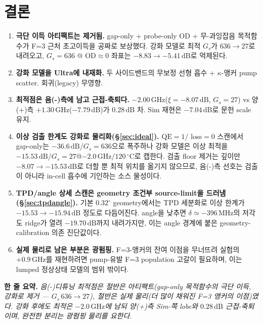\documentclass[11pt,a4paper]{article}
\newcommand{\dB}{\,\mathrm{dB}}
\newcommand{\GHz}{\,\mathrm{GHz}}
\newcommand{\MHz}{\,\mathrm{MHz}}
\newcommand{\degC}{\,^{\circ}\mathrm{C}}
\begin{document}
\section{결론}
\begin{enumerate}[nosep]
\item \textbf{극단 이득 아티팩트는 제거됨.} gap-only + probe-only OD + 무-과잉잡음
      목적함수가 F=3 근처 초고이득을 공짜로 보상했다. 강화 모델로 최적 $G_s$가
      $636\to27$로 내려오고, $G_s=636$ @ OD$\approx0$ 좌표는 $-8.83\to-5.41\dB$로
      억제된다.
\item \textbf{강화 모델을 Ultra에 내재화.} 두 사이드밴드의 무보정 선형 흡수 +
      $\kappa$-앵커 pump scatter. 회귀(legacy) 무영향.
\item \textbf{최적점은 음(-)측에 남고 근접-축퇴다.} $-2.00\GHz$($\xi=-8.07\dB$,
      $G_s=27$) vs 양(+)측 $+1.30\GHz$($-7.79\dB$)가 $0.28\dB$ 차. Sim 재현은
      $-7.04\dB$로 문헌 scale 유지.
\item \textbf{이상 검출 한계도 강화로 물리화(\S\ref{sec:ideal}).} $\mathrm{QE}=1$/
      loss$=0$ 스캔에서 gap-only는 $-36.6\dB$/$G_s=636$으로 폭주하나 강화 모델은
      이상 최적을 $-15.53\dB$/$G_s=27$@$-2.0\GHz/120\degC$로 캡한다. 검출 floor
      제거는 깊이만 $-8.07\to-15.53\dB$로 더할 뿐 최적 위치를 옮기지 않으므로,
      음(-)측 선호는 검출이 아니라 in-cell 흡수에 기인하는 소스 물성이다.
\item \textbf{TPD/angle 상세 스캔은 geometry 조건부 source-limit을 드러냄
      (\S\ref{sec:tpdangle}).} 기본 $0.32^\circ$ geometry에서는 TPD 세분화로
      이상 한계가 $-15.53\to-15.94\dB$ 정도로 다듬어진다. angle을 낮추면
      $\delta\simeq-396\MHz$의 저각도 ridge가 열려 $-19.70\dB$까지 내려가지만,
      이는 angle 경계에 붙은 geometry-calibration 의존 진단값이다.
\item \textbf{실제 물리로 남은 부분은 광펌핑.} F=3-앵커의 잔여 이점을 무너뜨려
      실험의 $+0.9\GHz$를 재현하려면 pump-유발 F=3 population 고갈이 필요하며,
      이는 lumped 정상상태 모델의 범위 밖이다.
\end{enumerate}

\noindent\textbf{한 줄 요약.} \emph{음(-)디튜닝 최적점은 절반은 아티팩트(gap-only
목적함수의 극단 이득, 강화로 제거 --- $G_s\,636\to27$), 절반은 실제 물리(더 많이
채워진 F=3 앵커의 이점)였다. 강화 후에도 최적은 $-2.0\GHz$에 남되 양(+)측 Sim-쪽
lobe와 $0.28\dB$ 근접-축퇴이며, 완전한 분리는 광펌핑 물리를 요한다.}

\appendix
\end{document}
